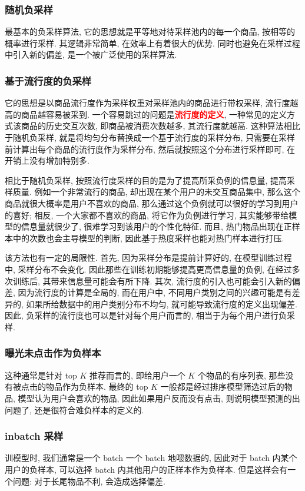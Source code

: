\subsubsection{随机负采样}
最基本的负采样算法, 它的思想就是平等地对待采样池内的每一个商品, 按相等的概率进行采样. 其逻辑非常简单, 在效率上有着很大的优势. 同时也避免在采样过程中引入新的偏差, 是一个被广泛使用的采样算法. 

\subsubsection{基于流行度的负采样}
它的思想是以商品流行度作为采样权重对采样池内的商品进行带权采样, 流行度越高的商品越容易被采到. 一个容易跳过的问题是\textcolor{red}{\textbf{流行度的定义}}, 一种常见的定义方式该商品的历史交互次数, 即商品被消费次数越多, 其流行度就越高. 这种算法相比于随机负采样, 就是将均匀分布替换成一个基于流行度的采样分布, 只需要在采样前计算出每个商品的流行度作为采样分布, 然后就按照这个分布进行采样即可, 在开销上没有增加特别多.
 
相比于随机负采样, 按照流行度采样的目的是为了提高所采负例的信息量, 提高采样质量. 例如一个非常流行的商品, 却出现在某个用户的未交互商品集中, 那么这个商品就很大概率是用户不喜欢的商品, 那么通过这个负例就可以很好的学习到用户的喜好; 相反, 一个大家都不喜欢的商品, 将它作为负例进行学习, 其实能够带给模型的信息量就很少了, 很难学习到该用户的个性化特征. 而且, 热门物品出现在正样本中的次数也会主导模型的判断, 因此基于热度采样也能对热门样本进行打压.

该方法也有一定的局限性. 首先, 因为采样分布是提前计算好的, 在模型训练过程中, 采样分布不会变化. 因此那些在训练初期能够提高更高信息量的负例, 在经过多次训练后, 其带来信息量可能会有所下降. 其次, 流行度的引入也可能会引入新的偏差, 因为流行度的计算是全局的, 而在用户中, 不同用户类别之间的兴趣可能是有差异的, 如果所给数据中的用户类别分布不均匀, 就可能导致流行度的定义出现偏差. 因此, 负采样的流行度也可以是针对每个用户而言的, 相当于为每个用户进行负采样.

\subsubsection{曝光未点击作为负样本}
这种通常是针对 top $K$ 推荐而言的, 即给用户一个 $K$ 个物品的有序列表, 那些没有被点击的物品作为负样本. 最终的 top $K$ 一般都是经过排序模型筛选过后的物品, 模型认为用户会喜欢的物品, 因此如果用户反而没有点击, 则说明模型预测的出问题了, 还是很符合难负样本的定义的. 

\subsubsection{inbatch 采样}
训模型时, 我们通常是一个 batch 一个 batch 地喂数据的, 因此对于 batch 内某个用户的负样本, 可以选择 batch 内其他用户的正样本作为负样本. 但是这样会有一个问题: 对于长尾物品不利, 会造成选择偏差.

